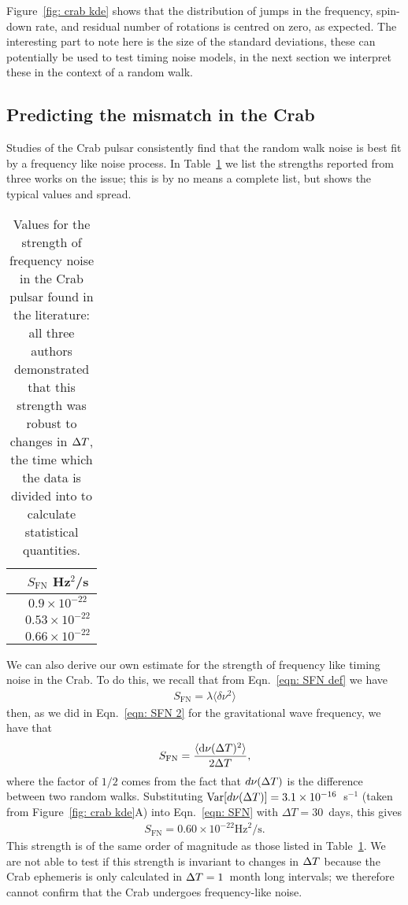 \documentclass[../full_thesis/full_thesis.tex]{subfiles}
\begin{document}
{Figure~\ref{fig: crab kde} shows that the distribution of jumps in the frequency,
spin-down rate, and residual number of rotations is centred on zero, as
expected. The interesting part to note here is the size of the standard deviations,
these can potentially be used to test timing noise models, in the next section
we interpret these in the context of a random walk.

\subsection{Predicting the mismatch in the Crab}

Studies of the Crab pulsar consistently find that the random walk noise is
best fit by a frequency like noise process. In Table~\ref{tab: SFN lit} we list
the strengths reported from three works on the issue; this is by no means a
complete list, but shows the typical values and spread.
\begin{table}[htb]
\centering
\begin{tabular}{c|c}
 & $S_{\textrm{FN}}$ Hz$^{2}$/s\\ \hline
\citet{Boynton1972} & $0.9\times10^{-22}$\\
\citet{Groth1975} & $ 0.53\times10^{-22}$\\
\citet{Cordes1980} & $0.66\times10^{-22}$
\end{tabular}
\caption{Values for the strength of frequency noise in the Crab pulsar found
         in the literature: all three authors demonstrated that this strength
         was robust to changes in $\Delta T$, the time which the data is divided into
         to calculate statistical quantities.}
\label{tab: SFN lit}
\end{table}

We can also derive our own estimate for the strength of frequency like timing noise
in the Crab. To do this, we recall that from Eqn.~\eqref{eqn: SFN def} we have
\begin{align}
S_{\textrm{FN}} = \lambda \langle \delta \nu^{2}\rangle
\end{align}
then, as we did in Eqn.~\eqref{eqn: SFN 2} for the gravitational wave frequency,
we have that
\begin{align}
S_{\textrm{FN}} = \frac{\langle \mathrm{d} \nu(\Delta T)^{2} \rangle }{2\Delta T},
\label{eqn: SFN}
\end{align}
where the factor of $1/2$ comes from the fact that $d\nu(\Delta T)$ is the
difference between two random walks. Substituting
$\textrm{Var}[d\nu(\Delta T)]=3.1\times10^{-16}$~s$^{-1}$ (taken from Figure~\ref{fig: crab
kde}A) into Eqn.~\eqref{eqn: SFN} with $\Delta T = 30$~days, this gives
\begin{align}
S_{\mathrm{FN}} = 0.60 \times 10^{-22} \textrm{Hz}^{2}/\textrm{s}.
\label{eqn: SFN mine}
\end{align} 
This strength is of the
same order of magnitude as those listed in Table~\ref{tab: SFN lit}. We are not
able to test if this strength is invariant to changes in $\Delta T$ because the
Crab ephemeris is only calculated in $\Delta T=1$~month long intervals; we therefore
cannot confirm that the Crab undergoes frequency-like noise.

}
\end{document}
